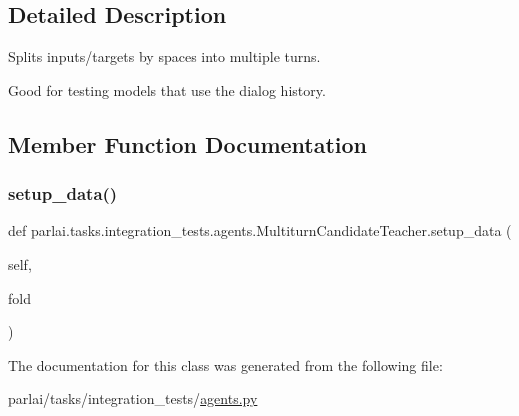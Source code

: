 \subsection{Detailed Description}
\begin{DoxyVerb}Splits inputs/targets by spaces into multiple turns.

Good for testing models that use the dialog history.
\end{DoxyVerb}
 

\subsection{Member Function Documentation}
\mbox{\label{classparlai_1_1tasks_1_1integration__tests_1_1agents_1_1MultiturnCandidateTeacher_aed2bfff52c3db13cb2a0d2acf41fdb8f}} 
\subsubsection{\texorpdfstring{setup\+\_\+data()}{setup\_data()}}
{\footnotesize\ttfamily def parlai.\+tasks.\+integration\+\_\+tests.\+agents.\+Multiturn\+Candidate\+Teacher.\+setup\+\_\+data (\begin{DoxyParamCaption}\item[{}]{self,  }\item[{}]{fold }\end{DoxyParamCaption})}



The documentation for this class was generated from the following file\+:\begin{DoxyCompactItemize}
\item 
parlai/tasks/integration\+\_\+tests/\hyperlink{parlai_2tasks_2integration__tests_2agents_8py}{agents.\+py}\end{DoxyCompactItemize}
